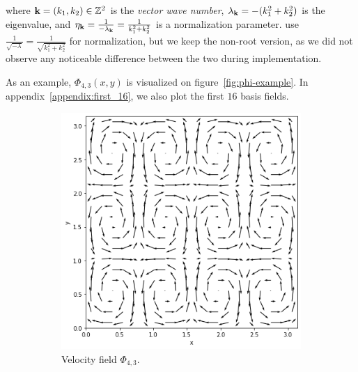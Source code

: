 where $\vb{k} = (k_1, k_2) \in \mathbb{Z}^2$ is the \textit{vector wave number},
$\lambda_{\vb{k}} = -(k_1^2 + k_2^2)$ is the eigenvalue, and $\eta_{\vb{k}}
= \frac{1}{-\lambda_{\vb{k}}} = \frac{1}{k_1^2 + k_2^2}$ is a normalization
parameter.  \cite{scalable-eigenfluids} use $\frac{1}{\sqrt{-\lambda}}
= \frac{1}{\sqrt{k_1^2 + k_2^2}}$ for normalization, but we keep the non-root
version, as we did not observe any noticeable difference between the two during
implementation.


As an example, $\Phi_{4,3}(x,y)$ is visualized on figure~\ref{fig:phi-example}.
In appendix~\ref{appendix:first_16}, we also plot the first $16$ basis fields.

\begin{figure}
  \centering
  \begin{subfigure}[t]{0.48\textwidth}
    \centering
    \includegraphics[height=\textwidth]{figures/eigenfluids/k_4_3_vel.png}
    \caption{Velocity field $\Phi_{4,3}$.}
  \end{subfigure}
  \begin{subfigure}[t]{0.48\textwidth}
    \centering

\end{subfigure}
\end{figure}
